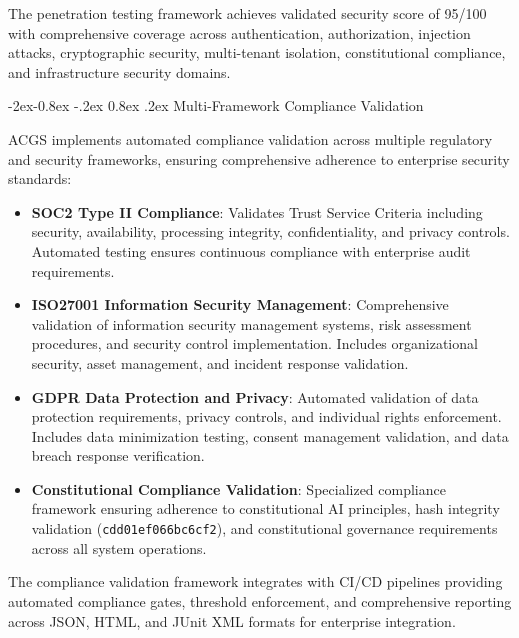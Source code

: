 \documentclass[manuscript,screen,9pt]{acmart}
\makeatletter
\renewcommand\subsubsection{\@startsection{subsubsection}{3}{\z@}%
  {-2ex\@plus -0.8ex \@minus -.2ex}%
  {0.8ex \@plus .2ex}%
  {\normalfont\normalsize\bfseries}}
\makeatother
\begin{document}
The penetration testing framework achieves validated security score of 95/100 with comprehensive coverage across authentication, authorization, injection attacks, cryptographic security, multi-tenant isolation, constitutional compliance, and infrastructure security domains.

\subsubsection{Multi-Framework Compliance Validation}
\label{subsubsec:compliance_validation}

ACGS implements automated compliance validation across multiple regulatory and security frameworks, ensuring comprehensive adherence to enterprise security standards:

\begin{itemize}[leftmargin=*,itemsep=2pt,parsep=1pt]
    \item \textbf{SOC2 Type II Compliance}: Validates Trust Service Criteria including security, availability, processing integrity, confidentiality, and privacy controls. Automated testing ensures continuous compliance with enterprise audit requirements.

    \item \textbf{ISO27001 Information Security Management}: Comprehensive validation of information security management systems, risk assessment procedures, and security control implementation. Includes organizational security, asset management, and incident response validation.

    \item \textbf{GDPR Data Protection and Privacy}: Automated validation of data protection requirements, privacy controls, and individual rights enforcement. Includes data minimization testing, consent management validation, and data breach response verification.

    \item \textbf{Constitutional Compliance Validation}: Specialized compliance framework ensuring adherence to constitutional AI principles, hash integrity validation (\texttt{cdd01ef066bc6cf2}), and constitutional governance requirements across all system operations.
\end{itemize}

The compliance validation framework integrates with CI/CD pipelines providing automated compliance gates, threshold enforcement, and comprehensive reporting across JSON, HTML, and JUnit XML formats for enterprise integration.
\end{document}
